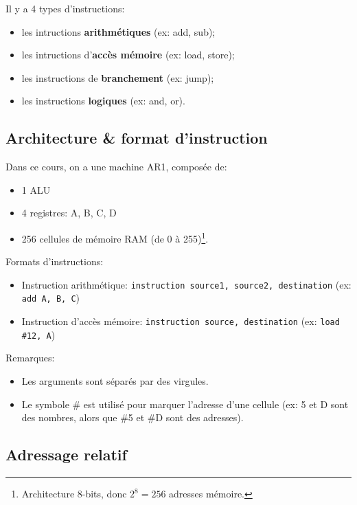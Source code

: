 \documentclass[a4paper]{article}
\begin{document}
Il y a 4 types d'instructions:
\begin{itemize}
    \item les intructions \textbf{arithmétiques} (ex: add, sub);
    \item les intructions d'\textbf{accès mémoire} (ex: load, store);
    \item les instructions de \textbf{branchement} (ex: jump);
    \item les instructions \textbf{logiques} (ex: and, or).
\end{itemize}





\subsection{Architecture \& format d'instruction}

Dans ce cours, on a une machine AR1, composée de:
\begin{itemize}
    \item 1 ALU
    \item 4 registres: A, B, C, D
    \item 256 cellules de mémoire RAM (de 0 à 255)\footnote{Architecture 8-bits, donc $ 2^8 = 256 $ adresses mémoire.}.
\end{itemize}

Formats d'instructions:
\begin{itemize}
    \item Instruction arithmétique: \texttt{instruction source1, source2, destination} (ex: \texttt{add A, B, C})
    \item Instruction d'accès mémoire: \texttt{instruction source, destination} (ex: \texttt{load \#12, A})
\end{itemize}

Remarques:
\begin{itemize}
    \item Les arguments sont séparés par des virgules.
    \item Le symbole \# est utilisé pour marquer l'adresse d'une cellule (ex: 5 et D sont des nombres, alors que \#5 et \#D sont des adresses).
\end{itemize}





\subsection{Adressage relatif}
\end{document}
